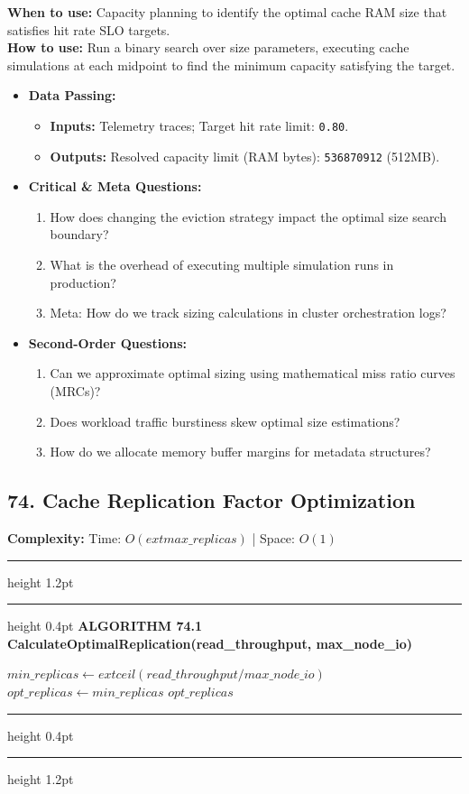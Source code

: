 \documentclass[11pt,a4paper]{article}
\newenvironment{textbookalgo}[2]{%
  \par\addvspace{1.2em}\noindent
  \hrule height 1.2pt
  \vspace{1.5pt}
  \hrule height 0.4pt
  \vspace{5pt}
  {\noindent\large\bfseries\sffamily ALGORITHM #1 \quad #2}
  \par\vspace{5pt}
  \RestyleAlgo{plain}
}{%
  \par\vspace{4pt}
  \hrule height 0.4pt
  \vspace{1.5pt}
  \hrule height 1.2pt
  \par\addvspace{1.2em}
}
\theoremstyle{definition}
\begin{document}
\noindent
\textbf{When to use:} Capacity planning to identify the optimal cache RAM size that satisfies hit rate SLO targets.\\
\textbf{How to use:} Run a binary search over size parameters, executing cache simulations at each midpoint to find the minimum capacity satisfying the target.
\begin{itemize}[leftmargin=*]
  \item[] \textbf{Data Passing:}
    \begin{itemize}
      \item \textbf{Inputs:} Telemetry traces; Target hit rate limit: \texttt{0.80}.
      \item \textbf{Outputs:} Resolved capacity limit (RAM bytes): \texttt{536870912} (512MB).
    \end{itemize}
  \item[] \textbf{Critical \& Meta Questions:}
  \begin{enumerate}
    \item How does changing the eviction strategy impact the optimal size search boundary?
    \item What is the overhead of executing multiple simulation runs in production?
    \item Meta: How do we track sizing calculations in cluster orchestration logs?
  \end{enumerate}
  \item[] \textbf{Second-Order Questions:}
  \begin{enumerate}
    \item Can we approximate optimal sizing using mathematical miss ratio curves (MRCs)?
    \item Does workload traffic burstiness skew optimal size estimations?
    \item How do we allocate memory buffer margins for metadata structures?
  \end{enumerate}
\end{itemize}
\medskip

\clearpage
\subsection{74. Cache Replication Factor Optimization}


\noindent
\textbf{Complexity:} Time: $O(	ext{max\_replicas})$ | Space: $O(1)$
\smallskip

\begin{textbookalgo}{74.1}{CalculateOptimalReplication(read\_throughput, max\_node\_io)}
\begin{algorithm}[H]
$min\_replicas \leftarrow 	ext{ceil}(read\_throughput / max\_node\_io)$\;
$opt\_replicas \leftarrow min\_replicas$\;
\Return $opt\_replicas$\;
\end{algorithm}
\end{textbookalgo}
\end{document}
